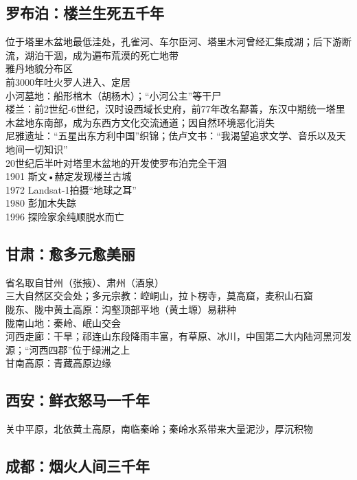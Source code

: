 \subsection*{罗布泊：楼兰生死五千年}

位于塔里木盆地最低洼处，孔雀河、车尔臣河、塔里木河曾经汇集成湖；后下游断流，湖泊干涸，成为遍布荒漠的死亡地带\\
雅丹地貌分布区\\
前3000年吐火罗人进入、定居\\
小河墓地：船形棺木（胡杨木）；“小河公主”等干尸\\
楼兰：前2世纪-6世纪，汉时设西域长史府，前77年改名鄯善，东汉中期统一塔里木盆地东南部，成为东西方文化交流通道；因自然环境恶化消失\\
尼雅遗址：“五星出东方利中国”织锦；佉卢文书：“我渴望追求文学、音乐以及天地间一切知识”\\
20世纪后半叶对塔里木盆地的开发使罗布泊完全干涸\\
1901 斯文•赫定发现楼兰古城\\
1972 Landsat-1拍摄“地球之耳”\\
1980 彭加木失踪\\
1996 探险家余纯顺脱水而亡

\subsection*{甘肃：愈多元愈美丽}

省名取自甘州（张掖）、肃州（酒泉）\\
三大自然区交会处；多元宗教：崆峒山，拉卜楞寺，莫高窟，麦积山石窟\\
陇东、陇中黄土高原：沟壑顶部平地（黄土塬）易耕种\\
陇南山地：秦岭、岷山交会\\
河西走廊：干旱；祁连山东段降雨丰富，有草原、冰川，中国第二大内陆河黑河发源；“河西四郡”位于绿洲之上\\
甘南高原：青藏高原边缘

\subsection*{西安：鲜衣怒马一千年}

关中平原，北依黄土高原，南临秦岭；秦岭水系带来大量泥沙，厚沉积物

\subsection*{成都：烟火人间三千年}

